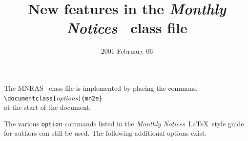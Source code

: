 \documentclass[useAMS]{mn2e}
\begin{document}
\title{New features in the \textit{Monthly Notices} \LaTeXe\ class file}
\date{2001 February 06}
   \onecolumn

\maketitle \label{firstpage}
 \nokeywords

The MNRAS \LaTeXe\ class file is implemented by placing the
command\\
 \verb"\documentclass["\textit{options}\verb"]{mn2e}"\\
at the start of the document.

The various \verb"option" commands listed in the \textit{Monthly
Notices}\ \LaTeX\ style guide for authors\nocite{209guide} can
still be used. The following additional options
exist.\label{dcolumn}
\end{document}
